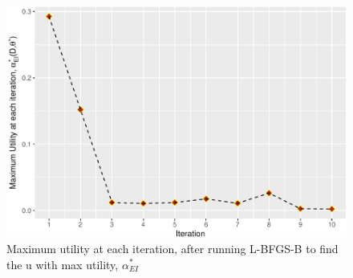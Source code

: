 \documentclass[]{elsarticle} %
\begin{document}
\begin{figure}

{\centering \includegraphics[width=468px]{0_Paper1_main_files/figure-latex/utilitycurve-1} 

}

\caption{Maximum utility at each iteration, after running L-BFGS-B to find the u with max utility, $\alpha_{EI}^*$}\label{fig:utilitycurve}
\end{figure}
\end{document}
